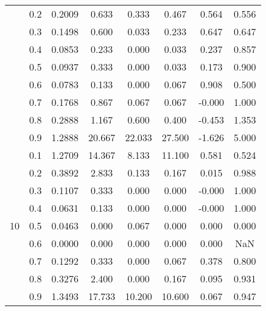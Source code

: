\documentclass[11pt,a4paper]{report}
\begin{document}
\begin{longtable}{ | c | c || c | c | c | c | c | c | }
 & 0.2 & 0.2009 & 0.633 & 0.333 & 0.467 & 0.564 & 0.556 \\
 & 0.3 & 0.1498 & 0.600 & 0.033 & 0.233 & 0.647 & 0.647 \\
 & 0.4 & 0.0853 & 0.233 & 0.000 & 0.033 & 0.237 & 0.857 \\
 & 0.5 & 0.0937 & 0.333 & 0.000 & 0.033 & 0.173 & 0.900 \\
 & 0.6 & 0.0783 & 0.133 & 0.000 & 0.067 & 0.908 & 0.500 \\
 & 0.7 & 0.1768 & 0.867 & 0.067 & 0.067 & -0.000 & 1.000 \\
 & 0.8 & 0.2888 & 1.167 & 0.600 & 0.400 & -0.453 & 1.353 \\
 & 0.9 & 1.2888 & 20.667 & 22.033 & 27.500 & -1.626 & 5.000 \\
 \hline
\multirow{9}{*}{10} & 0.1 & 1.2709 & 14.367 & 8.133 & 11.100 & 0.581 & 0.524 \\
 & 0.2 & 0.3892 & 2.833 & 0.133 & 0.167 & 0.015 & 0.988 \\
 & 0.3 & 0.1107 & 0.333 & 0.000 & 0.000 & -0.000 & 1.000 \\
 & 0.4 & 0.0631 & 0.133 & 0.000 & 0.000 & -0.000 & 1.000 \\
 & 0.5 & 0.0463 & 0.000 & 0.067 & 0.000 & 0.000 & 0.000 \\
 & 0.6 & 0.0000 & 0.000 & 0.000 & 0.000 & 0.000 & NaN \\
 & 0.7 & 0.1292 & 0.333 & 0.000 & 0.067 & 0.378 & 0.800 \\
 & 0.8 & 0.3276 & 2.400 & 0.000 & 0.167 & 0.095 & 0.931 \\
 & 0.9 & 1.3493 & 17.733 & 10.200 & 10.600 & 0.067 & 0.947 \\
 \hline
\hline
\end{longtable}
\end{document}
